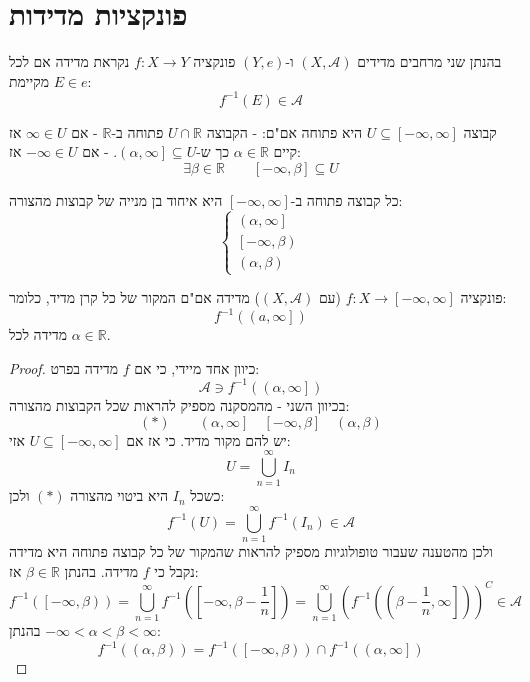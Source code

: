 \documentclass{tstextbook}
\begin{document}
\section{פונקציות מדידות}

\begin{definition}
בהנתן שני מרחבים מדידים \((X,\mathcal{A})\) ו-\((Y,e)\) פונקציה \(f:X\to Y\) נקראת מדידה אם לכל \(E \in e\) מקיימת:
$$f^{-1} (E) \in \mathcal{A}$$

\end{definition}
\begin{reminder}
קבוצה \(U\subseteq \left[ -\infty,\infty \right]\) היא פתוחה אם"ם:
- הקבוצה \(U\cap \mathbb{R}\) פתוחה ב-\(\mathbb{R}\)
- אם \(\infty \in U\) אז קיים \(\alpha \in \mathbb{R}\) כך ש-\(\left( \alpha,\infty \right]\subseteq U\).
- אם \(-\infty \in U\) אז:
$$\exists \beta \in \mathbb{R} \qquad  \left[ -\infty,\beta \right]\subseteq U$$

\end{reminder}
\begin{corollary}
כל קבוצה פתוחה ב-\(\left[ -\infty,\infty \right]\) היא איחוד בן מנייה של קבוצות מהצורה:
$$\begin{cases}\left( \alpha,\infty \right] \\\left[ -\infty,\beta \right) \\\left( \alpha,\beta \right)
\end{cases}$$

\end{corollary}
\begin{proposition}
פונקציה \(f:X\to \left[ -\infty,\infty \right]\) (עם \((X,\mathcal{A})\)) מדידה אם"ם המקור של כל קרן מדיד, כלומר:
$$f^{-1}\left( \left( a,\infty \right] \right)$$
מדידה לכל \(\alpha \in \mathbb{R}\).

\end{proposition}
\begin{proof}
כיוון אחד מיידי, כי אם \(f\) מדידה בפרט:
$$\mathcal{A} \ni f^{-1}\left( \left( \alpha,\infty \right] \right)$$
בכיוון השני - מהמסקנה מספיק להראות שכל הקבוצות מהצורה:
$$(*)\qquad \left( \alpha,\infty \right]\quad \left[ -\infty,\beta \right]\quad \left( \alpha,\beta \right)$$
יש להם מקור מדיד. כי אז אם \(U\subseteq \left[ -\infty,\infty \right]\) אזי:
$$U=\bigcup_{n=1}^{\infty} I_{n}$$
כשכל \(I_{n}\) היא ביטוי מהצורה \((*)\) ולכן:
$$f^{-1}(U)=\bigcup_{n=1}^{\infty} f^{-1}(I_{n}) \in \mathcal{A}$$
ולכן מהטענה שעבור טופולוגיות מספיק להראות שהמקור של כל קבוצה פתוחה היא מדידה נקבל כי \(f\) מדידה. בהנתן \(\beta \in \mathbb{R}\) אז:
$$f^{-1}\left( \left[ -\infty,\beta \right) \right)=\bigcup _{n=1}^{\infty}f^{-1}\left( \left[ -\infty,\beta-\frac{1}{n} \right] \right)=\bigcup_{n=1}^{\infty}\left( f^{-1}\left( \left( \beta-\frac{1}{n},\infty \right] \right) \right)^{C}\in \mathcal{A}$$
בהנתן \(-\infty<\alpha<\beta<\infty\):
$$f^{-1}\left( \left( \alpha,\beta \right) \right)=f^{-1}\left( \left[ -\infty,\beta \right) \right)\cap f^{-1}\left( \left( \alpha,\infty \right] \right)$$

\end{proof}
\end{document}
